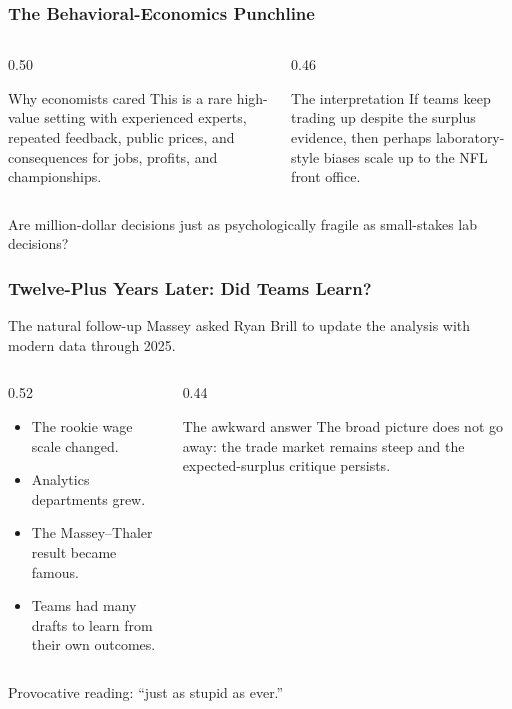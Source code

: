 \documentclass[aspectratio=169,professionalfonts]{beamer}
\begin{document}
\begin{frame}
\frametitle{The Behavioral-Economics Punchline}
\begin{columns}[T,totalwidth=\textwidth]
\begin{column}{0.50\textwidth}
\begin{block}{Why economists cared}
This is a rare high-value setting with experienced experts, repeated feedback, public prices, and consequences for jobs, profits, and championships.
\end{block}
\end{column}
\begin{column}{0.46\textwidth}
\begin{block}{The interpretation}
If teams keep trading up despite the surplus evidence, then perhaps laboratory-style biases scale up to the NFL front office.
\end{block}
\end{column}
\end{columns}

\vspace{3mm}
\begin{center}
\Large
\alert{Are million-dollar decisions just as psychologically fragile as small-stakes lab decisions?}
\end{center}
\end{frame}

\begin{frame}
\frametitle{Twelve-Plus Years Later: Did Teams Learn?}
\begin{block}{The natural follow-up}
Massey asked Ryan Brill to update the analysis with modern data through 2025.
\end{block}

\begin{columns}[T,totalwidth=\textwidth]
\begin{column}{0.52\textwidth}
\begin{itemize}
  \item The rookie wage scale changed.
  \item Analytics departments grew.
  \item The Massey--Thaler result became famous.
  \item Teams had many drafts to learn from their own outcomes.
\end{itemize}
\end{column}
\begin{column}{0.44\textwidth}
\begin{block}{The awkward answer}
The broad picture does \alert{not} go away: the trade market remains steep and the expected-surplus critique persists.
\end{block}
\end{column}
\end{columns}

\vspace{2mm}
\centering
\Large
\alert{Provocative reading: ``just as stupid as ever.''}
\end{frame}
\end{document}
